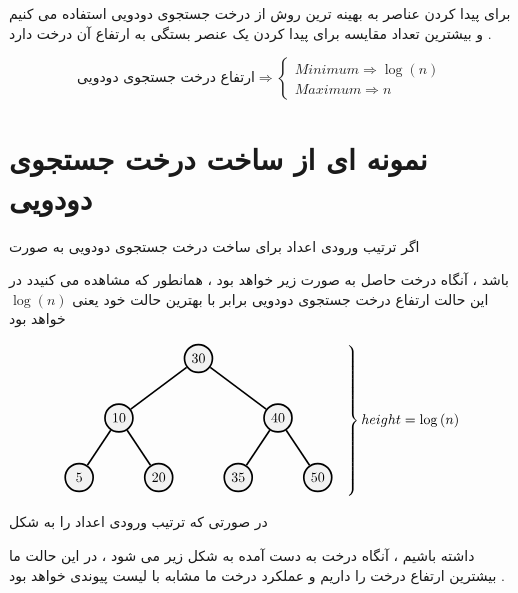 \documentclass[12pt]{article}
\begin{document}
\begin{tcolorbox}
برای پیدا کردن عناصر به بهینه ترین روش از درخت جستجوی دودویی استفاده می کنیم و بیشترین تعداد مقایسه برای پیدا کردن یک عنصر بستگی به ارتفاع آن درخت دارد .
\end{tcolorbox}



\begin{tcolorbox}
$$
\text{ارتفاع درخت جستجوی دودویی} \Rightarrow
\begin{cases}
Minimum \Rightarrow \log{(n)} \\
Maximum \Rightarrow n
\end{cases}
$$
\end{tcolorbox}



\section{نمونه ای از ساخت درخت جستجوی دودویی}

اگر ترتیب ورودی اعداد برای ساخت درخت جستجوی دودویی به صورت 
\begin{center}
\end{center}
 باشد ،
آنگاه درخت حاصل به صورت زیر خواهد بود ،
همانطور که مشاهده می کنیدد در این حالت ارتفاع درخت جستجوی دودویی برابر با بهترین حالت خود یعنی 
$\log{(n)}$
خواهد بود

\begin{latin}
\begin{center}
$$
\begin{rcases}
\begin{tikzpicture}[very thick,level/.style={sibling distance=40mm/#1}]
\tikzstyle{vertex}=[draw,fill=black!5,circle,minimum size=20pt,inner sep=1pt]
\node [vertex] (r){$30$}
  child {
	    node [vertex] (a) {$10$}
	    child {
		      node [vertex] {$5$}
	    }
	    child {
		      node [vertex] {$20$}
	    }
  }
  child {
	    node [vertex] {$40$}
	    child {
		      node [vertex] {$35$}
	    }
	    child {
		      node [vertex] {$50$}
	    }
  };
\end{tikzpicture}
&
\end{rcases} 
height = \log{(n)}
$$
\end{center}
\end{latin}


در صورتی که ترتیب ورودی اعداد را به شکل 
\begin{center}
\noindent
{}
\end{center}
 داشته باشیم ، آنگاه درخت به دست آمده به شکل زیر می شود ،
 در این حالت ما بیشترین ارتفاع درخت را داریم و عملکرد درخت ما مشابه با لیست پیوندی خواهد بود .
\end{document}
